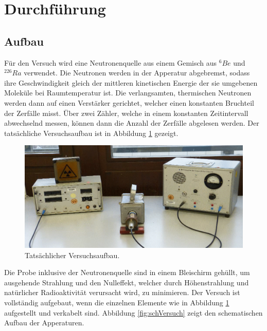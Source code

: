 \section{Durchführung}
\label{sec:Durchführung}

\subsection{Aufbau}
Für den Versuch wird eine Neutronenquelle aus einem Gemisch aus $^6Be$ und $^{226}Ra$ verwendet. Die Neutronen werden in der Apperatur abgebremst,
sodass ihre Geschwindigkeit gleich der mittleren kinetischen Energie der sie umgebenen Moleküle bei Raumtemperatur ist.
Die verlangsamten, thermischen Neutronen werden dann auf einen Verstärker gerichtet, welcher einen konstanten Bruchteil der Zerfälle misst.
Über zwei Zähler, welche in einem konstanten Zeitintervall abwechselnd messen, können dann die Anzahl der Zerfälle abgelesen werden.
Der tatsächliche Versuchsaufbau ist in Abbildung \ref{fig:tatVersuch} gezeigt.

\begin{figure}
    \centering
    \includegraphics[width=.9\textwidth]{plots/tatVersuch.png}
    \caption{Tatsächlicher Versuchsaufbau.\cite{Versuchsanleitung}}
    \label{fig:tatVersuch}
\end{figure}

Die Probe inklusive der Neutronenquelle sind in einem Bleischirm gehüllt, um ausgehende Strahlung und den Nulleffekt, welcher durch Höhenstrahlung und natürlicher Radioaktivität verursacht wird,
zu minimieren.
Der Versuch ist vollständig aufgebaut, wenn die einzelnen Elemente wie in Abbildung \ref{fig:tatVersuch} aufgestellt und verkabelt sind.
Abbildung \ref{fig:schVersuch} zeigt den schematischen Aufbau der Apperaturen.

